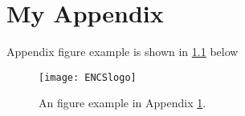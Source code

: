 \chapter{My Appendix} \label{chap:ApdxA}

Appendix figure example is shown in \ref{fig:encslogo} below
 
 \begin{figure}[htp]
     \begin{center}
         \texttt{[image: ENCSlogo]}  %
        \end{center}
        \caption{An figure example in Appendix \ref{chap:ApdxA}.}
        \label{fig:encslogo}
    \end{figure}
    
    
